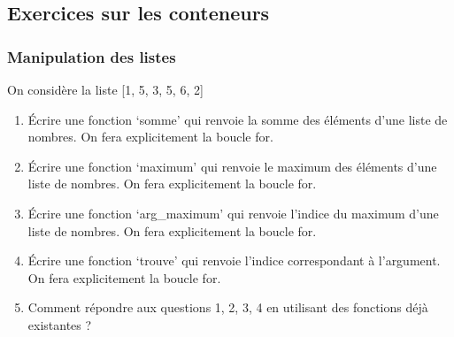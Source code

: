 \documentclass[letterpaper,10pt,english]{sphinxhowto}
\begin{document}
\subsection{Exercices sur les conteneurs}
\label{\detokenize{cours3_conteneur_exercices:exercices-sur-les-conteneurs}}\label{\detokenize{cours3_conteneur_exercices::doc}}

\subsubsection{Manipulation des listes}
\label{\detokenize{cours3_conteneur_exercices:manipulation-des-listes}}
\sphinxAtStartPar
On considère la liste {[}1, 5, 3, 5, 6, 2{]}
\begin{enumerate}
%
\item {} 
\sphinxAtStartPar
Écrire une fonction ‘somme’ qui renvoie la somme des éléments d’une liste de nombres. On fera explicitement la boucle for.

\item {} 
\sphinxAtStartPar
Écrire une fonction ‘maximum’ qui renvoie le maximum des éléments d’une liste de nombres. On fera explicitement la boucle for.

\item {} 
\sphinxAtStartPar
Écrire une fonction ‘arg\_maximum’ qui renvoie l’indice du maximum d’une liste de nombres. On fera explicitement la boucle for.

\item {} 
\sphinxAtStartPar
Écrire une fonction ‘trouve’ qui renvoie l’indice correspondant à l’argument. On fera explicitement la boucle for.

\item {} 
\sphinxAtStartPar
Comment répondre aux questions 1, 2, 3, 4 en utilisant des fonctions déjà existantes ?

\end{enumerate}
\end{document}
